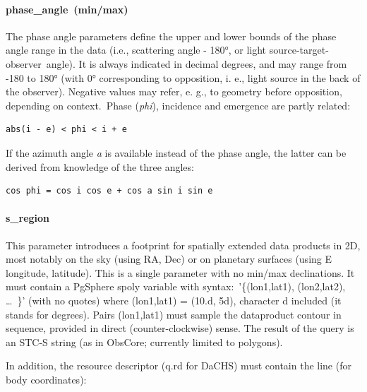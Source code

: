 \documentclass[11pt,a4paper]{ivoa}
\begin{document}
\paragraph{phase\_angle (min/max)}

The phase angle parameters define the upper and lower bounds of the phase angle range in the data (i.e., scattering angle - 180°, or light source-target-observer angle). It is always indicated in decimal degrees, and may range from -180 to 180° (with 0° corresponding to opposition, i. e., light source in the back of the observer). Negative values may refer, e. g., to geometry before opposition, depending on context. Phase (\emph{phi}), incidence and emergence are partly related:






\begin{verbatim}
abs(i - e) < phi < i + e
\end{verbatim}




If the azimuth angle \emph{a} is available instead of the phase angle, the latter can be derived from knowledge of the three angles:






\begin{verbatim}
cos phi = cos i cos e + cos a sin i sin e
\end{verbatim}




\paragraph{s\_region}

This parameter introduces a footprint for spatially extended data products in 2D, most notably on the sky (using RA, Dec) or on planetary surfaces (using E longitude, latitude). This is a single parameter with no min/max declinations. It must contain a PgSphere spoly variable with syntax: '\{(lon1,lat1), (lon2,lat2), … \}' (with no quotes) where (lon1,lat1) = (10.d, 5d), character d included (it stands for degrees). Pairs (lon1,lat1) must sample the dataproduct contour in sequence, provided in direct (counter-clockwise) sense. The result of the query is an STC-S string (as in ObsCore; currently limited to polygons).

In addition, the resource descriptor (q.rd for DaCHS) must contain the line (for body coordinates):
\end{document}
